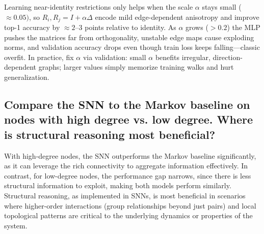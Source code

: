 \documentclass[11pt]{article}
\begin{document}
Learning near-identity restrictions only helps when the scale $\alpha$ stays small ($\approx 0.05)$, so $R_i,R_j = I + \alpha\Delta$ 
encode mild edge-dependent anisotropy and improve top-1 accuracy by $\approx 2–3$ points relative to identity. 
As $\alpha$ grows ($>0.2$) the MLP pushes the matrices far from orthogonality, unstable edge maps cause exploding norms, 
and validation accuracy drops even though train loss keeps falling—classic overfit. 
In practice, fix $\alpha$ via validation: small $\alpha$ benefits irregular, direction-dependent graphs; 
larger values simply memorize training walks and hurt generalization.


\subsection{Compare the SNN to the Markov baseline on nodes with high degree vs. low degree. 
Where is structural reasoning most beneficial?}

    With high-degree nodes, the SNN outperforms the Markov baseline significantly,
    as it can leverage the rich connectivity to aggregate information effectively.
    In contrast, for low-degree nodes, the performance gap narrows,
    since there is less structural information to exploit, making both models perform similarly.
    Structural reasoning, as implemented in SNNs, is most beneficial in scenarios where higher-order interactions 
    (group relationships beyond just pairs) and local topological patterns are critical to the underlying dynamics or properties of the system. 



\end{document}

